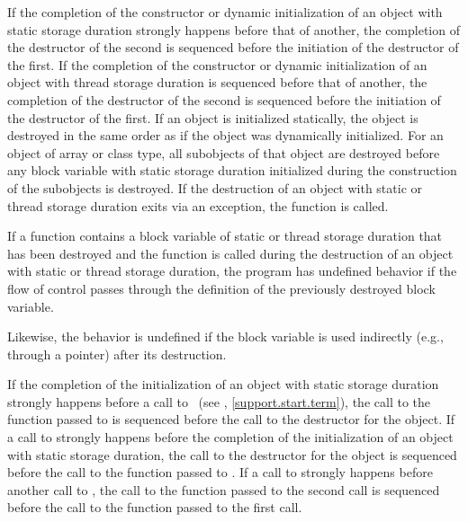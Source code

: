 \pnum
If the completion of the constructor or dynamic initialization of an object with static
storage duration strongly happens before that of another, the completion of the destructor
of the second is sequenced before the initiation of the destructor of the first.
If the completion of the constructor or dynamic initialization of an object with thread
storage duration is sequenced before that of another, the completion of the destructor
of the second is sequenced before the initiation of the destructor of the first.
If an object is
initialized statically, the object is destroyed in the same order as if
the object was dynamically initialized. For an object of array or class
type, all subobjects of that object are destroyed before any block
variable with static storage duration initialized during the construction
of the subobjects is destroyed.
If the destruction of an object with static or thread storage duration
exits via an exception,
the function  is called.

\pnum
If a function contains a block variable of static or thread storage duration that has been
destroyed and the function is called during the destruction of an object with static or
thread storage duration, the program has undefined behavior if the flow of control
passes through the definition of the previously destroyed block variable.
\begin{note}
Likewise, the behavior is undefined
if the block variable is used indirectly (e.g., through a pointer)
after its destruction.
\end{note}

\pnum
{}%
%
If the completion of the initialization of an object with static storage
duration strongly happens before a call to ~(see
, \ref{support.start.term}), the call to the function passed to
 is sequenced before the call to the destructor for the object. If a
call to  strongly happens before the completion of the initialization of
an object with static storage duration, the call to the destructor for the
object is sequenced before the call to the function passed to . If a
call to  strongly happens before another call to , the
call to the function passed to the second  call is sequenced before
the call to the function passed to the first  call.

